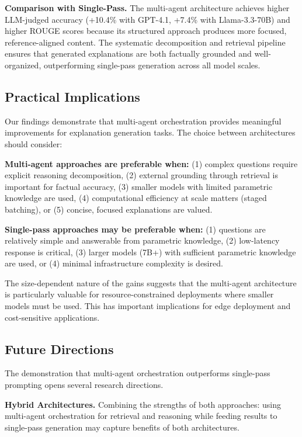 \textbf{Comparison with Single-Pass.} The multi-agent architecture achieves higher LLM-judged accuracy (+10.4\% with GPT-4.1, +7.4\% with Llama-3.3-70B) and higher ROUGE scores because its structured approach produces more focused, reference-aligned content. The systematic decomposition and retrieval pipeline ensures that generated explanations are both factually grounded and well-organized, outperforming single-pass generation across all model scales.

\subsection{Practical Implications}

Our findings demonstrate that multi-agent orchestration provides meaningful improvements for explanation generation tasks. The choice between architectures should consider:

\textbf{Multi-agent approaches are preferable when:} (1) complex questions require explicit reasoning decomposition, (2) external grounding through retrieval is important for factual accuracy, (3) smaller models with limited parametric knowledge are used, (4) computational efficiency at scale matters (staged batching), or (5) concise, focused explanations are valued.

\textbf{Single-pass approaches may be preferable when:} (1) questions are relatively simple and answerable from parametric knowledge, (2) low-latency response is critical, (3) larger models (7B+) with sufficient parametric knowledge are used, or (4) minimal infrastructure complexity is desired.

The size-dependent nature of the gains suggests that the multi-agent architecture is particularly valuable for resource-constrained deployments where smaller models must be used. This has important implications for edge deployment and cost-sensitive applications.

\subsection{Future Directions}

The demonstration that multi-agent orchestration outperforms single-pass prompting opens several research directions.

\textbf{Hybrid Architectures.} Combining the strengths of both approaches: using multi-agent orchestration for retrieval and reasoning while feeding results to single-pass generation may capture benefits of both architectures.


